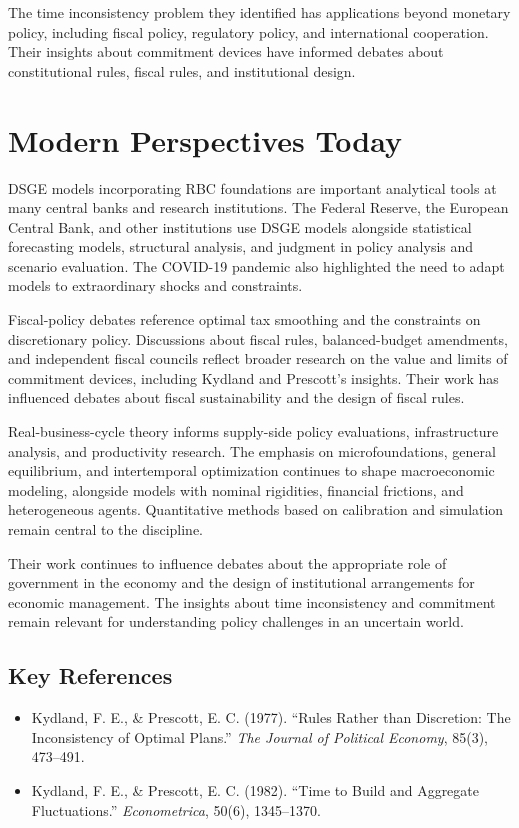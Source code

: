 The time inconsistency problem they identified has applications beyond monetary
policy, including fiscal policy, regulatory policy, and international
cooperation. Their insights about commitment devices have informed debates
about constitutional rules, fiscal rules, and institutional design.

\section{Modern Perspectives Today}
DSGE models incorporating RBC foundations are important analytical tools at many
central banks and research institutions. The Federal Reserve, the European
Central Bank, and other institutions use DSGE models alongside statistical
forecasting models, structural analysis, and judgment in policy analysis and
scenario evaluation. The COVID-19 pandemic also highlighted the need to adapt
models to extraordinary shocks and constraints.

Fiscal-policy debates reference optimal tax smoothing and the constraints on
discretionary policy. Discussions about fiscal rules, balanced-budget
amendments, and independent fiscal councils reflect broader research on the
value and limits of commitment devices, including Kydland and Prescott's
insights. Their work has influenced debates about fiscal sustainability and the
design of fiscal rules.

Real-business-cycle theory informs supply-side policy evaluations, infrastructure
analysis, and productivity research. The emphasis on microfoundations, general
equilibrium, and intertemporal optimization continues to shape macroeconomic
modeling, alongside models with nominal rigidities, financial frictions, and
heterogeneous agents. Quantitative methods based on calibration and simulation
remain central to the discipline.

Their work continues to influence debates about the appropriate role of
government in the economy and the design of institutional arrangements for
economic management. The insights about time inconsistency and commitment
remain relevant for understanding policy challenges in an uncertain world.

\subsection*{Key References}
\begin{itemize}
    \item Kydland, F. E., \& Prescott, E. C. (1977). ``Rules Rather than Discretion: The Inconsistency of Optimal Plans.'' \textit{The Journal of Political Economy}, 85(3), 473--491.
    \item Kydland, F. E., \& Prescott, E. C. (1982). ``Time to Build and Aggregate Fluctuations.'' \textit{Econometrica}, 50(6), 1345--1370.
\end{itemize}
